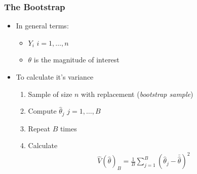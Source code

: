 \documentclass[
  shownotes,
  xcolor={svgnames},
  hyperref={colorlinks,citecolor=DarkBlue,linkcolor=andesred,urlcolor=DarkBlue}
  , aspectratio=169]{beamer}
\begin{document}
\begin{frame}[fragile]
\frametitle{The Bootstrap}


\begin{itemize}
  \item In general terms:
    \begin{itemize}
      \item $Y_i$ $i=1,\dots,n$
      \item $\theta$ is the magnitude of interest
    \end{itemize}
    \item To calculate it's variance
   \begin{enumerate}
    \item Sample of size $n$ with replacement ({\it bootstrap sample})
    \medskip
    \item Compute $\hat{\theta}_j$ $j=1,\dots,B$
    \medskip
    \item Repeat $B$ times
    \medskip
    \item Calculate
    \begin{align}
    \hat{V}(\hat{\theta})_B =\frac{1}{B}\sum_{j=1}^B (\hat{\theta}_j- \bar{\hat{\theta}})^2
    \end{align}
   \end{enumerate}
  \medskip


\end{itemize}
 
 \end{frame}
\end{document}
